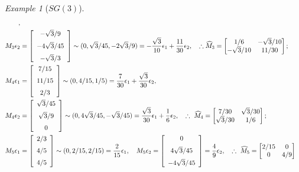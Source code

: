 \documentclass[a4paper]{amsart}
\theoremstyle{plain}
\theoremstyle{definition}
\theoremstyle{remark}
\newtheorem{example}[theorem]{Example}
\begin{document}
\begin{example}[$ SG(3) $]
\begin{align*}
, 
\\
M_3 \epsilon_2  &= \left[ \begin {array}{c} -\sqrt {3}/9\\\noalign{\medskip}-
4\sqrt {3}/45\\\noalign{\medskip}-\sqrt {3}/3\end {array} \right]  \sim (0,\sqrt{3}/45, -2\sqrt{3}/9)
=   -\frac{ \sqrt{3}}{10}\epsilon_1 + \frac{11}{30}\epsilon_2     ,
\quad 
\therefore \widehat{M}_3 = \begin{bmatrix} 1/6 & - \sqrt{3}/10 \\-\sqrt{3}/10 & 11/30 \end{bmatrix};
\\
M_4 \epsilon_1  &=  \left[ \begin {array}{c} 7/15 \\\noalign{\medskip}
11/15\\\noalign{\medskip}2/3\end {array} \right] \sim (0, 4/15,1/5) 
= \frac{7}{30} \epsilon_1 + \frac{\sqrt{3}}{30} \epsilon_2 
, \\
M_4 \epsilon_2  &=   \left[ \begin {array}{c} \sqrt {3}/45\\\noalign{\medskip}\sqrt {3}/9
\\\noalign{\medskip}0\end {array} \right] \sim (0,4\sqrt{3}/45, -\sqrt{3}/45)
=   \frac{\sqrt{3}}{30}\epsilon_1+\frac{1}{6}\epsilon_2        , \quad 
\therefore\ \widehat{M}_4  = \begin{bmatrix}  7/30 & \sqrt{3}/30\\ \sqrt{3}/30 & 1/6         \end{bmatrix};
\\
M_5 \epsilon_1  &=   \left[ \begin {array}{c} 2/3\\\noalign{\medskip}4/5
\\\noalign{\medskip}4/5\end {array} \right] \sim (0,2/15, 2/15)= \frac{2}{15} \epsilon_1 ,\quad 
M_5 \epsilon_2   =   \left[ \begin {array}{c} 0\\\noalign{\medskip}4\sqrt {3}/45\\\noalign{\medskip}-4\sqrt {3}/45 
\end {array} \right]  
= \frac{4}{9} \epsilon_2 ,
\quad 
\therefore\ \widehat{M}_5   = \begin{bmatrix} 2/15 & 0 \\ 0 & 4/9 \end{bmatrix}

\end{align*}
\end{example}
\end{document}
